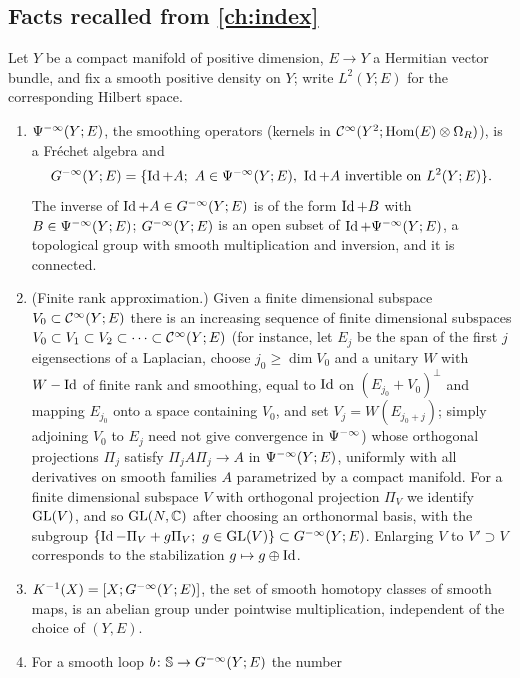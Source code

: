 \subsection{Facts recalled from \cref{ch:index}}
Let $Y$ be a compact manifold of positive dimension, $E\to Y$ a Hermitian vector
bundle, and fix a smooth positive density on $Y$; write $L^2(Y;E)$ for the
corresponding Hilbert space.
\begin{enumerate}[label=(B\arabic*),leftmargin=*]
\item\label{bott:B:Ginf} $\Psi^{-\infty}(Y;E)$, the smoothing operators (kernels in
  $\mathcal{C}^\infty(Y^2;\operatorname{Hom}(E)\otimes\Omega_R)$), is a Fr\'echet algebra and
  \begin{equation*}
    \Ginf(Y;E)=\{\Id+A;\ A\in\Psido{-\infty}(Y;E),\ \Id+A \text{ invertible on } L^2(Y;E)\}.
  \end{equation*}
  The inverse of $\operatorname{Id}+A\in G^{-\infty}(Y;E)$ is of the form $\operatorname{Id}+B$ with
  $B\in\Psi^{-\infty}(Y;E)$; $G^{-\infty}(Y;E)$ is an open subset of
  $\operatorname{Id}+\Psi^{-\infty}(Y;E)$, a topological group with smooth multiplication and
  inversion, and it is connected.
\item\label{bott:B:finite} (Finite rank approximation.) Given a finite dimensional
  subspace $V_0\subset\mathcal{C}^\infty(Y;E)$ there is an increasing sequence of finite dimensional
  subspaces $V_0\subset V_1\subset V_2\subset\dots\subset\mathcal{C}^\infty(Y;E)$ (for instance,
  let $E_j$ be the span of the first $j$ eigensections of a Laplacian, choose
  $j_0\ge\dim V_0$ and a unitary $W$ with $W-\operatorname{Id}$ of finite rank and smoothing,
  equal to $\operatorname{Id}$ on $(E_{j_0}+V_0)^\perp$ and mapping $E_{j_0}$ onto a space
  containing $V_0$, and set $V_j=W(E_{j_0+j})$; simply adjoining $V_0$ to $E_j$
  need not give convergence in $\Psi^{-\infty}$) whose orthogonal
  projections $\Pi_j$ satisfy $\Pi_jA\Pi_j\to A$ in $\Psi^{-\infty}(Y;E)$,
  uniformly with all derivatives on smooth families $A$ parametrized by a compact
  manifold. For a finite dimensional subspace $V$ with orthogonal projection $\Pi_V$
  we identify $\operatorname{GL}(V)$, and so $\operatorname{GL}(N,\mathbb{C})$ after choosing an orthonormal basis, with
  the subgroup $\{\Id-\Pi_V+g\Pi_V;\ g\in\GL(V)\}\subset\Ginf(Y;E)$. Enlarging $V$ to
  $V'\supset V$ corresponds to the stabilization $g\mapsto g\oplus\operatorname{Id}$.
\item\label{bott:B:K1} $K^{-1}(X)=[X;G^{-\infty}(Y;E)]$, the set of smooth homotopy classes of
  smooth maps, is an abelian group under pointwise multiplication, independent of
  the choice of $(Y,E)$.
\item\label{bott:B:wind} For a smooth loop $b\colon\mathbb{S}\to G^{-\infty}(Y;E)$ the number

\end{enumerate}
